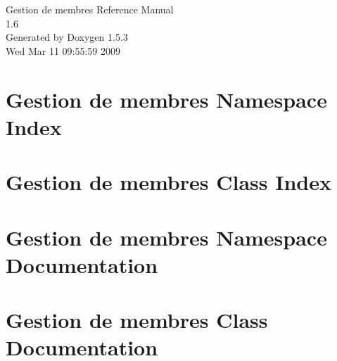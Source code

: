 \documentclass[a4paper]{book}
\begin{document}
\begin{titlepage}
\vspace*{7cm}
\begin{center}
{\Large Gestion de membres Reference Manual\\[1ex]\large 1.6 }\\
\vspace*{1cm}
{\large Generated by Doxygen 1.5.3}\\
\vspace*{0.5cm}
{\small Wed Mar 11 09:55:59 2009}\\
\end{center}
\end{titlepage}
\clearemptydoublepage
{}
\tableofcontents
\clearemptydoublepage
{}
\chapter{Gestion de membres Namespace Index}

\chapter{Gestion de membres Class Index}

\chapter{Gestion de membres Namespace Documentation}

\chapter{Gestion de membres Class Documentation}


\printindex
\end{document}
